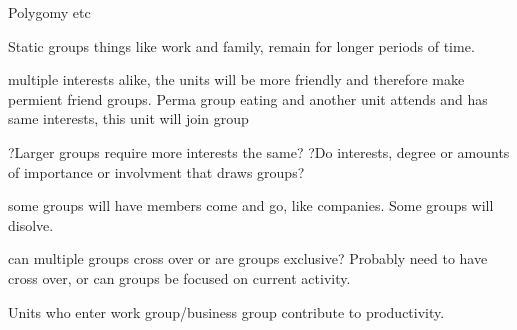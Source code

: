 Polygomy etc






Static groups things like work and family, remain for longer periods of time.

multiple interests alike, the units will be more friendly and therefore make permient friend groups.
Perma group eating and another unit attends and has same interests, this unit will join group

?Larger groups require more interests the same?
?Do interests, degree or amounts of importance or involvment that draws groups?

some groups will have members come and go, like companies. 
Some groups will disolve.

can multiple groups cross over or are groups exclusive? Probably need to have cross over, or can groups be focused on current activity.


Units who enter work group/business group contribute to productivity. 




